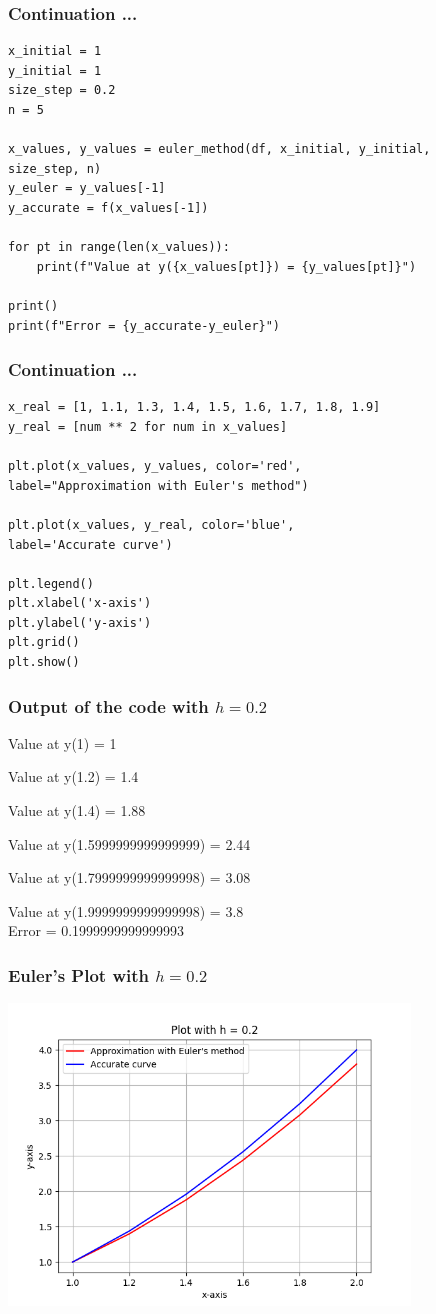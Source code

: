 \documentclass{beamer}
\begin{document}
\begin{frame}[fragile]
  \frametitle{Continuation ...}
   \begin{verbatim}
x_initial = 1
y_initial = 1
size_step = 0.2
n = 5

x_values, y_values = euler_method(df, x_initial, y_initial, 
size_step, n)
y_euler = y_values[-1]
y_accurate = f(x_values[-1])

for pt in range(len(x_values)):
    print(f"Value at y({x_values[pt]}) = {y_values[pt]}")

print()
print(f"Error = {y_accurate-y_euler}")
\end{verbatim}
\end{frame}

\begin{frame}[fragile]
  \frametitle{Continuation ...}
   \begin{verbatim}
x_real = [1, 1.1, 1.3, 1.4, 1.5, 1.6, 1.7, 1.8, 1.9]
y_real = [num ** 2 for num in x_values]

plt.plot(x_values, y_values, color='red',
label="Approximation with Euler's method")

plt.plot(x_values, y_real, color='blue',
label='Accurate curve')

plt.legend()
plt.xlabel('x-axis')
plt.ylabel('y-axis')
plt.grid()
plt.show()

  \end{verbatim}
\end{frame}

\begin{frame}[fragile]
  \frametitle{Output of the code with $h = 0.2$}
Value at y(1) = 1

Value at y(1.2) = 1.4

Value at y(1.4) = 1.88

Value at y(1.5999999999999999) = 2.44

Value at y(1.7999999999999998) = 3.08

Value at y(1.9999999999999998) = 3.8\\[10pt]
Error = 0.1999999999999993

\end{frame}

\begin{frame}
  \frametitle{Euler's Plot with $h = 0.2$}
  \begin{center}
    \includegraphics[width=0.8\textwidth]{Euler_02.png}
  \end{center}
\end{frame}
\end{document}
